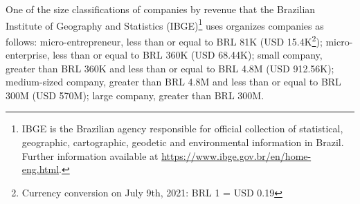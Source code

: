\documentclass[runningheads]{llncs}
\begin{document}
{%
}

One of the size classifications of companies by revenue that the Brazilian Institute of Geography and Statistics (IBGE)\footnote{IBGE is the Brazilian agency responsible for official collection of statistical, geographic, cartographic, geodetic and environmental information in Brazil. Further information available at \url{https://www.ibge.gov.br/en/home-eng.html}.} uses organizes companies as follows: micro-entrepreneur, less than or equal to BRL 81K (USD 15.4K\footnote{Currency conversion on July 9th, 2021: BRL 1 = USD 0.19}); micro-enterprise, less than or equal to BRL 360K (USD 68.44K); small company, greater than BRL 360K and less than or equal to BRL 4.8M (USD 912.56K); medium-sized company, greater than BRL 4.8M and less than or equal to BRL 300M (USD 570M); large company, greater than BRL 300M.
\end{document}

